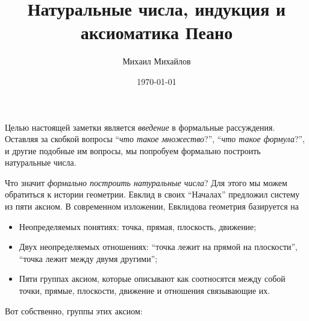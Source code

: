 \documentclass{article}
\title{Натуральные числа, индукция и аксиоматика Пеано}
\author{Михаил Михайлов}
\date{\today}
\begin{document}
\maketitle
\tableofcontents
\newpage

Целью настоящей заметки является \textit{введение} в формальные рассуждения. Оставляя за скобкой вопросы \enquote{\textit{что такое множество}?}, \enquote{\textit{что такое формула}?}, и другие подобные им вопросы, мы попробуем формально построить натуральные числа. 

Что значит \textit{формально построить натуральные числа}? Для этого мы можем обратиться к истории геометрии. Евклид в своих \enquote{Началах} предложил систему из пяти аксиом. В современном изложении, Евклидова геометрия базируется на 
\begin{itemize}[noitemsep, parsep=0pt, topsep=0pt]
    \item Неопределяемых понятиях: точка, прямая, плоскость, движение;
    \item Двух неопределяемых отношениях: \enquote{точка лежит на прямой на плоскости}, \enquote{точка лежит между двумя другими};
    \item Пяти группах аксиом, которые описывают как соотносятся между собой точки, прямые, плоскости, движение и отношения связывающие их.
\end{itemize}
Вот собственно, группы этих аксиом:
\end{document}
